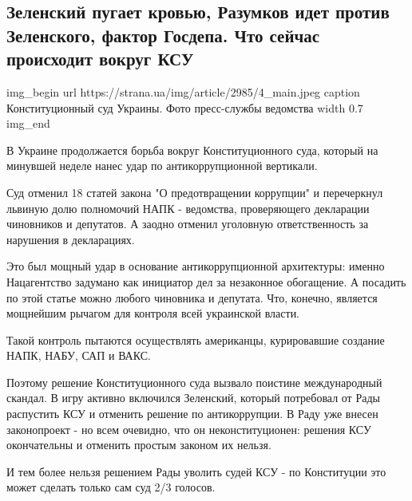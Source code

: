  
 
 

\subsection{Зеленский пугает кровью, Разумков идет против Зеленского, фактор Госдепа. Что сейчас происходит вокруг КСУ}
\label{sec:02_11_2020.news.ua.strana.1.ks}


\ifcmt
img_begin 
	url https://strana.ua/img/article/2985/4_main.jpeg
	caption Конституционный суд Украины. Фото пресс-службы ведомства 
	width 0.7
img_end
\fi

В Украине продолжается борьба вокруг Конституционного суда, который на минувшей
неделе нанес удар по антикоррупционной вертикали.

Суд отменил 18 статей закона "О предотвращении коррупции" и перечеркнул львиную
долю полномочий НАПК - ведомства, проверяющего декларации чиновников и
депутатов. А заодно отменил уголовную ответственность за нарушения в
декларациях. 

Это был мощный удар в основание антикоррупционной архитектуры: именно
Нацагентство задумано как инициатор дел за незаконное обогащение. А посадить по
этой статье можно любого чиновника и депутата. Что, конечно, является мощнейшим
рычагом для контроля всей украинской власти.

Такой контроль пытаются осуществлять американцы, курировавшие создание НАПК,
НАБУ, САП и ВАКС. 

Поэтому решение Конституционного суда вызвало поистине международный скандал. В
игру активно включился Зеленский, который потребовал от Рады распустить КСУ и
отменить решение по антикоррупции. В Раду уже внесен законопроект - но всем
очевидно, что он неконституционен: решения КСУ окончательны и отменить простым
законом их нельзя.

И тем более нельзя решением Рады уволить судей КСУ - по Конституции это может
сделать только сам суд 2/3 голосов.

